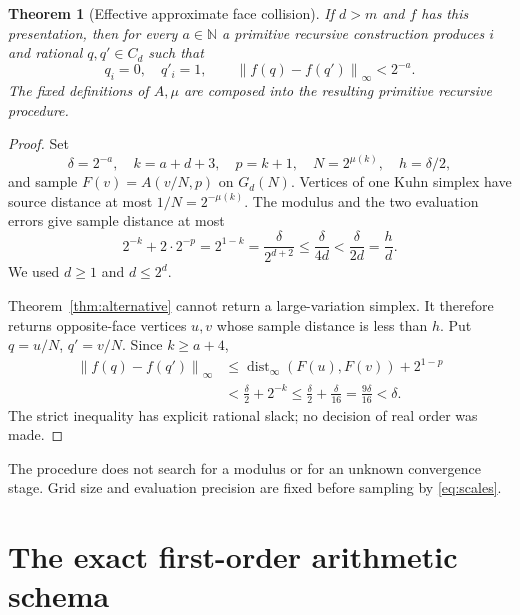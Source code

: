 \documentclass[11pt,a4paper]{article}
\newtheorem{theorem}{Theorem}[section]
\theoremstyle{definition}
\newcommand{\N}{\mathbb N}\newcommand{\Z}{\mathbb Z}
\newcommand{\dist}{\operatorname{dist}_{\infty}}
\newcommand{\norm}[1]{\left\lVert #1\right\rVert_{\infty}}
\begin{document}
\begin{theorem}[Effective approximate face collision]\label{thm:collision}
If $d>m$ and $f$ has this presentation, then for every
$a\in\N$ a primitive recursive construction produces
$i$ and rational $q,q'\in C_d$ such that
\[
 q_i=0,\quad q'_i=1,\qquad
                  \norm{f(q)-f(q')}<2^{-a}.
\]
The fixed definitions of $A,\mu$ are composed into the
resulting primitive recursive procedure.
\end{theorem}
\begin{proof}
Set
\begin{equation}\label{eq:scales}
 \delta=2^{-a},\quad k=a+d+3,\quad p=k+1,\quad
 N=2^{\mu(k)},\quad h=\delta/2,
\end{equation}
and sample $F(v)=A(v/N,p)$ on $G_d(N)$.
Vertices of one Kuhn simplex have source distance at most
$1/N=2^{-\mu(k)}$. The modulus and the two evaluation
errors give sample distance at most
\begin{equation}\label{eq:smallbound}
 2^{-k}+2\cdot2^{-p}
 =2^{1-k}
 =\frac{\delta}{2^{d+2}}
 \leq\frac{\delta}{4d}
 <\frac{\delta}{2d}
 =\frac hd.
\end{equation}
We used $d\geq1$ and $d\leq2^d$.

Theorem~\ref{thm:alternative} cannot return a large-variation
simplex. It therefore returns opposite-face vertices $u,v$
whose sample distance is less than $h$. Put $q=u/N$,
$q'=v/N$. Since $k\geq a+4$,
\begin{align*}
 \norm{f(q)-f(q')}
 &\leq\dist(F(u),F(v))+2^{1-p}\\
 &<\frac{\delta}{2}+2^{-k}
 \leq\frac{\delta}{2}+\frac{\delta}{16}
 =\frac{9\delta}{16}<\delta.
\end{align*}
The strict inequality has explicit rational slack; no
decision of real order was made.
\end{proof}

The procedure does not search for a modulus or for an unknown
convergence stage. Grid size and evaluation precision are
fixed before sampling by \eqref{eq:scales}.

\section{The exact first-order arithmetic schema}\label{sec:schema}
\end{document}
